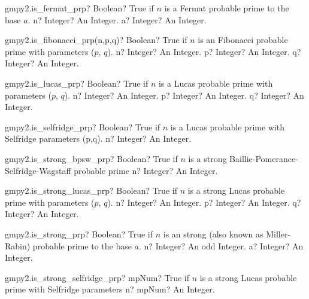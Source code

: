 \documentclass[12pt,a4paper,openany]{book}
\begin{document}
\begin{mpFunctionsExtract}
\mpFunctionTwo
{gmpy2.is\_fermat\_prp? Boolean? True if $n$ is a Fermat probable prime to the base $a$.}
{n? Integer? An Integer.}
{a? Integer? An Integer.}
\end{mpFunctionsExtract}

\begin{mpFunctionsExtract}
\mpFunctionThree
{gmpy2.is\_fibonacci\_prp(n,p,q)? Boolean? True if $n$ is an Fibonacci probable prime with parameters ($p$, $q$).}
{n? Integer? An Integer.}
{p? Integer? An Integer.}
{q? Integer? An Integer.}
\end{mpFunctionsExtract}

\begin{mpFunctionsExtract}
\mpFunctionThree
{gmpy2.is\_lucas\_prp? Boolean? True if $n$ is a Lucas probable prime with parameters ($p$, $q$).}
{n? Integer? An Integer.}
{p? Integer? An Integer.}
{q? Integer? An Integer.}
\end{mpFunctionsExtract}

\begin{mpFunctionsExtract}
\mpFunctionOne
{gmpy2.is\_selfridge\_prp? Boolean? True if $n$ is a Lucas probable prime with Selfridge parameters (p,q).}
{n? Integer? An Integer.}
\end{mpFunctionsExtract}

\begin{mpFunctionsExtract}
\mpFunctionOne
{gmpy2.is\_strong\_bpsw\_prp? Boolean? True if $n$ is a strong Baillie-Pomerance-Selfridge-Wagstaff probable prime}
{n? Integer? An Integer.}
\end{mpFunctionsExtract}

\begin{mpFunctionsExtract}
\mpFunctionThree
{gmpy2.is\_strong\_lucas\_prp? Boolean? True if $n$ is a strong Lucas probable prime with parameters ($p$, $q$).}
{n? Integer? An Integer.}
{p? Integer? An Integer.}
{q? Integer? An Integer.}
\end{mpFunctionsExtract}

\begin{mpFunctionsExtract}
\mpFunctionTwo
{gmpy2.is\_strong\_prp? Boolean? True if $n$ is an strong (also known as Miller-Rabin) probable prime to the base $a$.}
{n? Integer? An odd Integer.}
{a? Integer? An Integer.}
\end{mpFunctionsExtract}

\begin{mpFunctionsExtract}
\mpFunctionOne
{gmpy2.is\_strong\_selfridge\_prp? mpNum? True if $n$ is a strong Lucas probable prime with Selfridge parameters}
{n? mpNum? An Integer.}
\end{mpFunctionsExtract}
\end{document}
